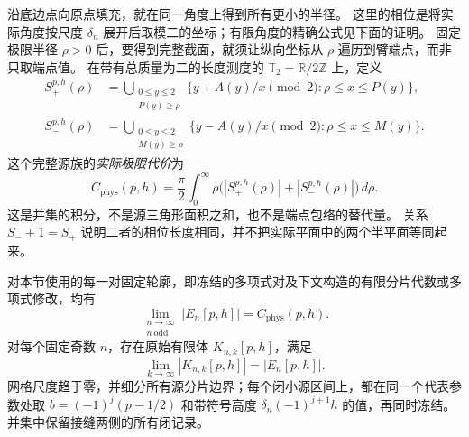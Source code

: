 沿底边点向原点填充，就在同一角度上得到所有更小的半径。
这里的相位是将实际角度按尺度 $\delta_n$ 展开后取模二的坐标；有限角度的精确公式见下面的证明。
固定极限半径 $\rho>0$ 后，要得到完整截面，就须让纵向坐标从 $\rho$ 遍历到臂端点，而非只取端点值。
在带有总质量为二的长度测度的 $\mathbb T_2=\mathbb R/2\mathbb Z$ 上，定义
\begin{align}
 S_+^{p,h}(\rho)&=\bigcup_{\substack{0\le y\le2\\P(y)\ge\rho}}
 \{y+A(y)/x\pmod2:\rho\le x\le P(y)\},\\
 S_-^{p,h}(\rho)&=\bigcup_{\substack{0\le y\le2\\M(y)\ge\rho}}
 \{y-A(y)/x\pmod2:\rho\le x\le M(y)\}.
\end{align}
这个完整源族的\emph{实际极限代价}为
\begin{equation}\label{eq:upper-physical-cost}
 C_{\mathrm{phys}}(p,h)=\frac\pi2\int_0^\infty
 \rho\bigl(|S_+^{p,h}(\rho)|+|S_-^{p,h}(\rho)|\bigr)\,d\rho.
\end{equation}
这是并集的积分，不是源三角形面积之和，也不是端点包络的替代量。
关系 $S_-+1=S_+$ 说明二者的相位长度相同，并不把实际平面中的两个半平面等同起来。

\begin{proposition}[两阶段实际面积恢复]\label{prop:upper-recovery}
对本节使用的每一对固定轮廓，即冻结的多项式对及下文构造的有限分片代数或多项式修改，均有
\[
 \lim_{\substack{n\to\infty\\n\ \mathrm{odd}}}|E_n[p,h]|
       =C_{\mathrm{phys}}(p,h).
\]
对每个固定奇数 $n$，存在原始有限体 $K_{n,k}[p,h]$，满足
\[
 \lim_{k\to\infty}|K_{n,k}[p,h]|=|E_n[p,h]|.
\]
网格尺度趋于零，并细分所有源分片边界；每个闭小源区间上，都在同一个代表参数处取 $b=(-1)^j(p-1/2)$ 和带符号高度 $\delta_n(-1)^{j+1}h$ 的值，再同时冻结。
并集中保留接缝两侧的所有闭记录。
\end{proposition}

